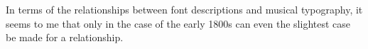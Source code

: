 \documentclass[10pt,fullmemo,memoaddrto,memodate]{newlfm}
\begin{document}
\begin{newlfm}
In terms of the relationships between font descriptions and musical
typography, it seems to me that only in the case of the early 1800s can even
the slightest case be made for a relationship.  
\end{newlfm}
\end{document}
